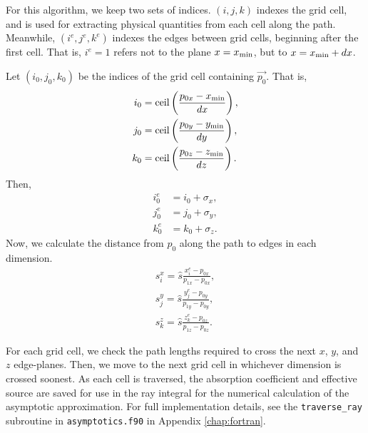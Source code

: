 For this algorithm, we keep two sets of indices. $(i,j,k)$ indexes the grid
cell, and is used for extracting physical quantities from each cell along
the path.
Meanwhile, $(i^e,j^e,k^e)$ indexes the edges between grid cells, beginning
after the first cell. That is, $i^e=1$ refers not to the plane $x={x_{\min}}$, but to $x={x_{\min}}+dx$.

Let $(i_0, j_0, k_0)$ be the indices of the grid cell containing $\vec{p_0}$.
That is,
\begin{align}
  i_0 &= \mbox{ceil}\left(\frac{p_{0x}-{x_{\min}}}{dx}\right), \\
  j_0 &= \mbox{ceil}\left(\frac{p_{0y}-{y_{\min}}}{dy}\right), \\
  k_0 &= \mbox{ceil}\left(\frac{p_{0z}-{z_{\min}}}{dz}\right).
\end{align}
Then,
\begin{align}
  i_0^e &= i_0 + \sigma_x, \\
  j_0^e &= j_0 + \sigma_y, \\
  k_0^e &= k_0 + \sigma_z.
\end{align}
Now, we calculate the distance from $p_0$ along the path to edges in each dimension.
\begin{align}
  s_i^x = \hat{s}\frac{x_i^e-p_{0x}}{p_{1x}-p_{0x}}, \\
  s_j^y = \hat{s}\frac{y_j^e-p_{0y}}{p_{1y}-p_{0y}}, \\
  s_k^z = \hat{s}\frac{z_k^e-p_{0z}}{p_{1z}-p_{0z}}.
\end{align}

For each grid cell, we check the path lengths
required to cross the next $x$, $y$, and $z$ edge-planes.
Then, we move to the next grid cell in whichever dimension
is crossed soonest.
As each cell is traversed, the absorption coefficient and effective source are saved for use in the ray integral for the numerical calculation of the asymptotic approximation.
For full implementation details, see the \texttt{traverse\_ray} subroutine in \texttt{asymptotics.f90} in Appendix \ref{chap:fortran}.

